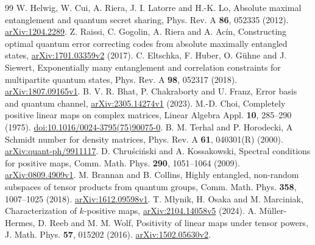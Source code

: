 \documentclass[11pt,a4paper]{article}
\begin{document}
\clearpage
\begingroup\small
\begin{thebibliography}{99}
W. Helwig, W. Cui, A. Riera, J. I. Latorre and H.-K. Lo,
Absolute maximal entanglement and quantum secret sharing,
Phys. Rev. A \textbf{86}, 052335 (2012).
\href{https://arxiv.org/abs/1204.2289}{arXiv:1204.2289}.
Z. Raissi, C. Gogolin, A. Riera and A. Ac\'in,
Constructing optimal quantum error correcting codes from absolute maximally entangled states,
\href{https://arxiv.org/abs/1701.03359v2}{arXiv:1701.03359v2} (2017).
C. Eltschka, F. Huber, O. G\"uhne and J. Siewert,
Exponentially many entanglement and correlation constraints for multipartite quantum states,
Phys. Rev. A \textbf{98}, 052317 (2018).
\href{https://arxiv.org/abs/1807.09165v1}{arXiv:1807.09165v1}.
B. V. R. Bhat, P. Chakraborty and U. Franz,
Error basis and quantum channel,
\href{https://arxiv.org/abs/2305.14274v1}{arXiv:2305.14274v1} (2023).
M.-D. Choi, Completely positive linear maps on complex matrices,
Linear Algebra Appl. \textbf{10}, 285--290 (1975).
\href{https://doi.org/10.1016/0024-3795(75)90075-0}{doi:10.1016/0024-3795(75)90075-0}.
B. M. Terhal and P. Horodecki,
A Schmidt number for density matrices,
Phys. Rev. A \textbf{61}, 040301(R) (2000).
\href{https://arxiv.org/abs/quant-ph/9911117}{arXiv:quant-ph/9911117}.
D. Chru\'sci\'nski and A. Kossakowski,
Spectral conditions for positive maps,
Comm. Math. Phys. \textbf{290}, 1051--1064 (2009).
\href{https://arxiv.org/abs/0809.4909v1}{arXiv:0809.4909v1}.
M. Brannan and B. Collins,
Highly entangled, non-random subspaces of tensor products from quantum groups,
Comm. Math. Phys. \textbf{358}, 1007--1025 (2018).
\href{https://arxiv.org/abs/1612.09598v1}{arXiv:1612.09598v1}.
T. M{\l}ynik, H. Osaka and M. Marciniak,
Characterization of $k$-positive maps,
\href{https://arxiv.org/abs/2104.14058v5}{arXiv:2104.14058v5} (2024).
A. M\"uller-Hermes, D. Reeb and M. M. Wolf,
Positivity of linear maps under tensor powers,
J. Math. Phys. \textbf{57}, 015202 (2016).
\href{https://arxiv.org/abs/1502.05630v2}{arXiv:1502.05630v2}.
\end{thebibliography}
\endgroup
\end{document}
